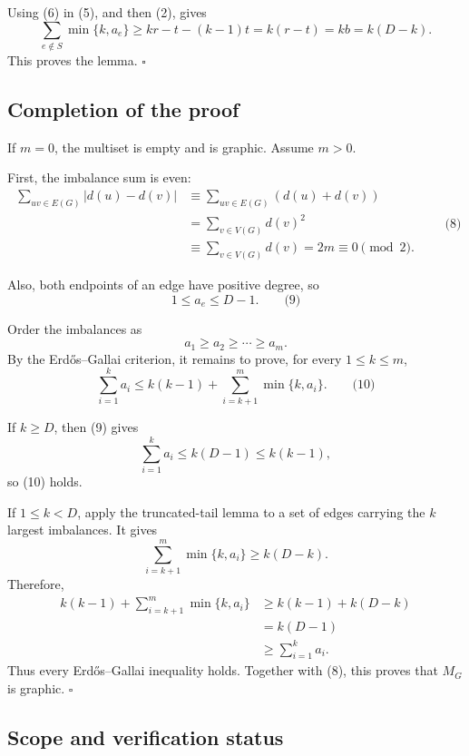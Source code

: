 \documentclass[
  11pt,
  a4paper,
]{article}
\begin{document}
Using (6) in (5), and then (2), gives \[
\sum_{e\notin S}\min\{k,a_e\}
\ge kr-t-(k-1)t
=k(r-t)
=kb
=k(D-k).
\] This proves the lemma. \(\square\)

\subsection{Completion of the proof}\label{completion-of-the-proof}

If \(m=0\), the multiset is empty and is graphic. Assume \(m>0\).

First, the imbalance sum is even: \begin{equation*}
\begin{aligned}
\sum_{uv\in E(G)}|d(u)-d(v)|
&\equiv \sum_{uv\in E(G)}(d(u)+d(v))\\
&=\sum_{v\in V(G)}d(v)^2\\
&\equiv\sum_{v\in V(G)}d(v)
=2m
\equiv0\pmod2.
\end{aligned} \qquad\text{(8)}
\end{equation*}

Also, both endpoints of an edge have positive degree, so \[
1\le a_e\le D-1. \qquad\text{(9)}
\]

Order the imbalances as \[
a_1\ge a_2\ge\cdots\ge a_m.
\] By the Erdős--Gallai criterion, it remains to prove, for every
\(1\le k\le m\), \[
\sum_{i=1}^{k}a_i
\le k(k-1)+\sum_{i=k+1}^{m}\min\{k,a_i\}. \qquad\text{(10)}
\]

If \(k\ge D\), then (9) gives \[
\sum_{i=1}^{k}a_i
\le k(D-1)
\le k(k-1),
\] so (10) holds.

If \(1\le k<D\), apply the truncated-tail lemma to a set of edges
carrying the \(k\) largest imbalances. It gives \[
\sum_{i=k+1}^{m}\min\{k,a_i\}\ge k(D-k).
\] Therefore, \begin{equation*}
\begin{aligned}
k(k-1)+\sum_{i=k+1}^{m}\min\{k,a_i\}
&\ge k(k-1)+k(D-k)\\
&=k(D-1)\\
&\ge\sum_{i=1}^{k}a_i.
\end{aligned}
\end{equation*} Thus every Erdős--Gallai inequality holds. Together with
(8), this proves that \(M_G\) is graphic. \(\square\)

\subsection{Scope and verification
status}\label{scope-and-verification-status}
\end{document}
